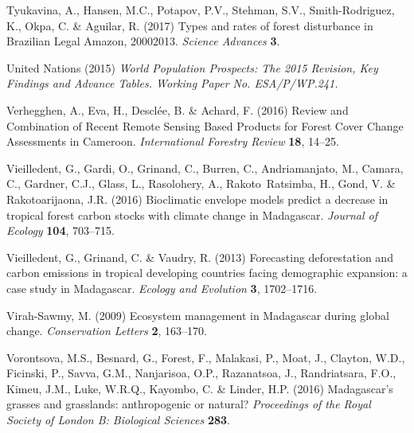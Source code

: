 \documentclass[a4paper, 12pt, leqno]{article} %
\begin{document}
\begin{thebibliography}{60}
Tyukavina, A., Hansen, M.C., Potapov, P.V., Stehman, S.V., Smith-Rodriguez, K.,
  Okpa, C. \& Aguilar, R. (2017) {Types and rates of forest disturbance in
  Brazilian Legal Amazon, 2000{\textendash}2013}. \emph{Science Advances}
  \textbf{3}.

{United Nations} (2015) \emph{{World Population Prospects: The 2015 Revision,
  Key Findings and Advance Tables. Working Paper No. ESA/P/WP.241.}}

Verhegghen, A., Eva, H., Desclée, B. \& Achard, F. (2016) {Review and
  Combination of Recent Remote Sensing Based Products for Forest Cover Change
  Assessments in Cameroon}. \emph{International Forestry Review} \textbf{18},
  14--25.

Vieilledent, G., Gardi, O., Grinand, C., Burren, C., Andriamanjato, M., Camara,
  C., Gardner, C.J., Glass, L., Rasolohery, A., Rakoto~Ratsimba, H., Gond, V.
  \& Rakotoarijaona, J.R. (2016) {Bioclimatic envelope models predict a
  decrease in tropical forest carbon stocks with climate change in Madagascar}.
  \emph{Journal of Ecology} \textbf{104}, 703--715.

Vieilledent, G., Grinand, C. \& Vaudry, R. (2013) {Forecasting deforestation
  and carbon emissions in tropical developing countries facing demographic
  expansion: a case study in Madagascar}. \emph{Ecology and Evolution}
  \textbf{3}, 1702--1716.

Virah-Sawmy, M. (2009) {Ecosystem management in Madagascar during global
  change}. \emph{Conservation Letters} \textbf{2}, 163--170.

Vorontsova, M.S., Besnard, G., Forest, F., Malakasi, P., Moat, J., Clayton,
  W.D., Ficinski, P., Savva, G.M., Nanjarisoa, O.P., Razanatsoa, J.,
  Randriatsara, F.O., Kimeu, J.M., Luke, W.R.Q., Kayombo, C. \& Linder, H.P.
  (2016) {Madagascar's grasses and grasslands: anthropogenic or natural?}
  \emph{Proceedings of the Royal Society of London B: Biological Sciences}
  \textbf{283}.

\end{thebibliography}
\end{document}
